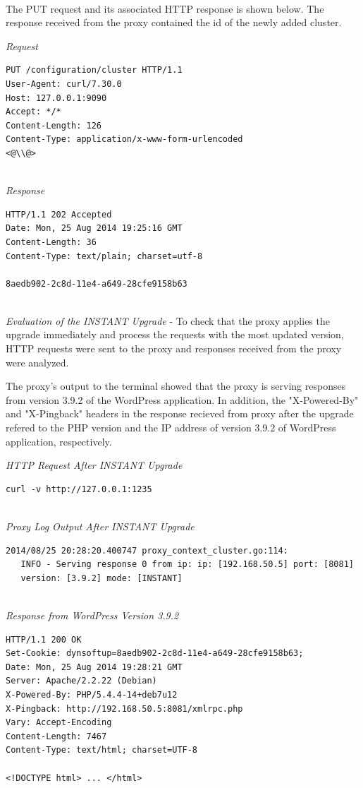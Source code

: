 \documentclass[a4paper,11pt,twoside]{report}
\begin{document}
\noindent\\
The PUT request and its associated HTTP response is shown below. The response received from the proxy contained the id of the newly added cluster.\smallskip 

\noindent
\textit{Request}
\begin{lstlisting}[language=terminal]
PUT /configuration/cluster HTTP/1.1
User-Agent: curl/7.30.0
Host: 127.0.0.1:9090
Accept: */*
Content-Length: 126
Content-Type: application/x-www-form-urlencoded
<@\\@>
\end{lstlisting}

\noindent\\
\textit{Response}
\begin{lstlisting}[language=terminal]
HTTP/1.1 202 Accepted
Date: Mon, 25 Aug 2014 19:25:16 GMT
Content-Length: 36
Content-Type: text/plain; charset=utf-8

8aedb902-2c8d-11e4-a649-28cfe9158b63
\end{lstlisting}  

\noindent\\
\textit{Evaluation of the INSTANT Upgrade} - To check that the proxy applies the upgrade immediately and process the requests with the most updated version, HTTP requests were sent to the proxy and responses received from the proxy were analyzed.

The proxy's output to the terminal showed that the proxy is serving responses from version 3.9.2 of the WordPress application. In addition, the "X-Powered-By" and "X-Pingback" headers in the response recieved from proxy after the upgrade refered to the PHP version and the IP address of version 3.9.2 of WordPress application, respectively. \smallskip 

\noindent
\textit{HTTP Request After INSTANT Upgrade}
\begin{lstlisting}[language=terminal]
curl -v http://127.0.0.1:1235
\end{lstlisting}

\noindent\\
\textit{Proxy Log Output After INSTANT Upgrade}
\begin{lstlisting}[language=terminal]
2014/08/25 20:28:20.400747 proxy_context_cluster.go:114:     
   INFO - Serving response 0 from ip: ip: [192.168.50.5] port: [8081] 
   version: [3.9.2] mode: [INSTANT]
\end{lstlisting}

\noindent\\
\textit{Response from WordPress Version 3.9.2 }
\begin{lstlisting}[language=terminal]
HTTP/1.1 200 OK
Set-Cookie: dynsoftup=8aedb902-2c8d-11e4-a649-28cfe9158b63;
Date: Mon, 25 Aug 2014 19:28:21 GMT
Server: Apache/2.2.22 (Debian)
X-Powered-By: PHP/5.4.4-14+deb7u12
X-Pingback: http://192.168.50.5:8081/xmlrpc.php
Vary: Accept-Encoding
Content-Length: 7467
Content-Type: text/html; charset=UTF-8

<!DOCTYPE html> ... </html>
\end{lstlisting}
\end{document}
